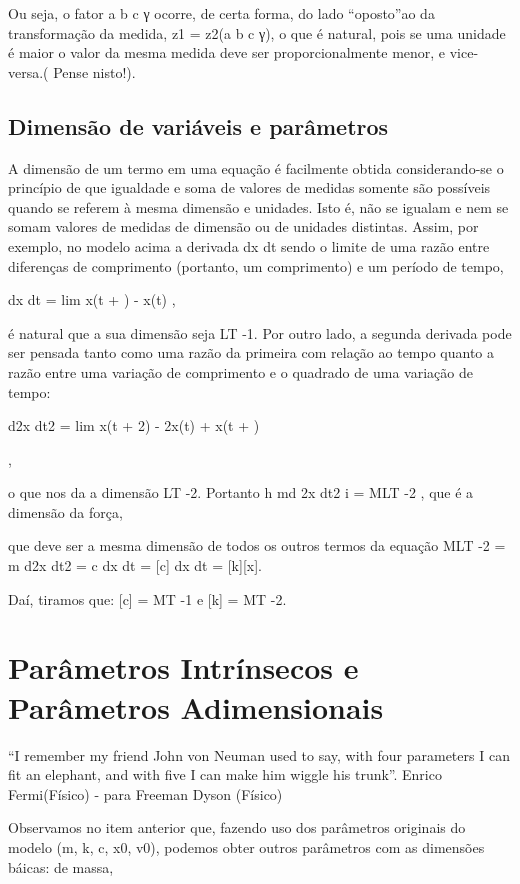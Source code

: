 Ou seja, o fator a \alpha b \beta c γ ocorre, de certa forma, do lado “oposto”ao da transformação da medida, z1 = z2(a \alpha b
\beta c γ), o que é natural, pois se uma unidade é maior o valor da mesma medida deve ser proporcionalmente menor, e vice-versa.( Pense nisto!).

\subsection{Dimensão de variáveis e parâmetros}

A dimensão de um termo em uma equação é facilmente obtida considerando-se o princípio de que igualdade e soma de valores de medidas somente são possíveis quando se referem à mesma dimensão e unidades. Isto é, não se igualam e nem se somam valores de medidas de dimensão ou de unidades distintas. Assim, por exemplo, no modelo acima a derivada dx dt sendo o limite de uma razão entre diferenças de comprimento (portanto, um comprimento) e um período de tempo,

dx
dt = lim
\delta{}
x(t + \delta) - x(t)
\delta,

é natural que a sua dimensão seja LT -1. Por outro lado, a segunda derivada pode ser pensada tanto como uma razão da primeira com relação ao tempo quanto a razão entre uma variação de comprimento e o quadrado de uma variação de tempo:

d2x
dt2
= lim
\delta{}
x(t + 2\delta) - 2x(t) + x(t + \delta)

,

o que nos da a dimensão LT -2. Portanto h
md
2x
dt2
i
= MLT -2
, que é a dimensão da força,

que deve ser a mesma dimensão de todos os outros termos da equação
MLT -2 =
m
d2x
dt2
=
c
dx
dt 
= [c]
dx
dt 
= [k][x].

Daí, tiramos que: [c] = MT -1 e [k] = MT -2.

\section{Parâmetros Intrínsecos e Parâmetros Adimensionais}

“I remember my friend John von Neuman used to say, with four parameters I can fit an elephant, and with five I can make him 
wiggle his trunk”.
Enrico Fermi(Físico) - para Freeman Dyson (Físico) 

Observamos no item anterior que, fazendo uso dos parâmetros originais do modelo (m, k, c, x0, v0), podemos obter outros parâmetros com as dimensões báicas: de massa, 

